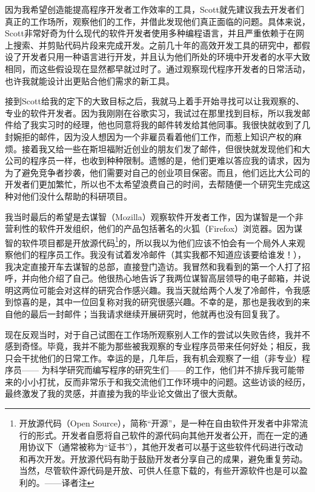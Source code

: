 \documentclass[letter,12pt]{book}
\begin{document}
\begin{CJK}{UTF8}{gbsn}
因为我希望创造能提高程序开发者工作效率的工具，Scott就先建议我去开发者们真正的工作场所，观察他们的工作，并借此发现他们真正面临的问题。具体来说，Scott非常好奇为什么现代的软件开发者使用多种编程语言，并且严重依赖于在网上搜索、并剪贴代码片段来完成开发。之前几十年的高效开发工具的研究中，都假设了开发者只用一种语言进行开发，并且认为他们所处的环境中开发者的水平大致相同，而这些假设现在显然都早就过时了。通过观察现代程序开发者的日常活动，也许我就能设计出更贴合他们需求的新工具。

接到Scott给我的定下的大致目标之后，我就马上着手开始寻找可以让我观察的、专业的软件开发者。因为我刚刚在谷歌实习，我试过在那里找到目标，所以我发邮件给了我实习时的经理，他也同意将我的邮件转发给其他同事。我很快就收到了几封婉拒的邮件，因为没人想因为一个非雇员看着他们工作，而惹上知识产权的麻烦。接着我又给一些在斯坦福附近创业的朋友们发了邮件，但很快就发现他们和大公司的程序员一样，也收到种种限制。遗憾的是，他们更难以答应我的请求，因为为了避免竞争者抄袭，他们需要对自己的创业项目保密。而且，他们远比大公司的开发者们更加繁忙，所以也不太希望浪费自己的时间，去帮随便一个研究生完成这种对他们没什么帮助的科研项目。

我当时最后的希望是去谋智（Mozilla）观察软件开发者工作，因为谋智是一个非营利性的软件开发组织，他们的产品包括著名的火狐（Firefox）浏览器。因为谋智的软件项目都是开放源代码\footnote{开放源代码（Open Source），简称“开源”，是一种在自由软件开发者中非常流行的形式。开发者自愿将自己软件的源代码向其他开发者公开，而在一定的通用协议下（通常被称为“证书”），其他开发者可以基于这些软件代码进行改动和再次开发。开放源代码有助于鼓励开发者分享自己的成果，避免重复劳动。当然，尽管软件源代码是开放、可供人任意下载的，有些开源软件也是可以盈利的。——译者注}的，所以我以为他们应该不怕会有一个局外人来观察他们的程序员工作。我没有试着发冷邮件（其实我都不知道应该要给谁发！），我决定直接开车去谋智的总部，直接登门造访。我冒然和我看到的第一个人打了招呼，并向他介绍了自己。他很热心地告诉了我两位谋智高层领导的电子邮箱，并说明这两位可能会对这样的研究合作感兴趣。我当天就给两个人发了冷邮件，令我感到惊喜的是，其中一位回复称对我的研究很感兴趣。不幸的是，那也是我收到的来自他的最后一封邮件；当我请求继续开展研究时，他就再也没有回复我了。

现在反观当时，对于自己试图在工作场所观察别人工作的尝试以失败告终，我并不感到奇怪。毕竟，我并不能为那些被我观察的专业程序员带来任何好处；相反，我只会干扰他们的日常工作。幸运的是，几年后，我有机会观察了一组（非专业）程序员—— 为科学研究而编写程序的研究生们——的工作，他们并不排斥我可能带来的小小打扰，反而非常乐于和我交流他们工作环境中的问题。这些访谈的经历，最终激发了我的灵感，并直接为我的毕业论文做出了很大贡献。


\end{CJK}
\end{document}
